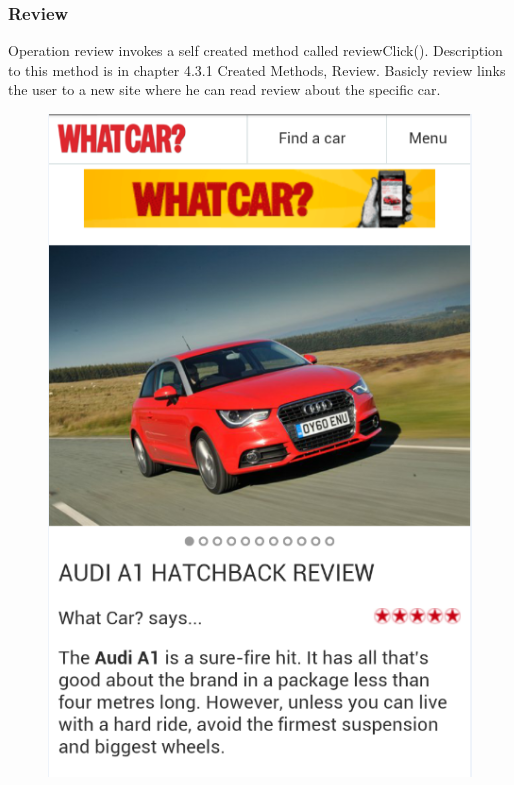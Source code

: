 \subsubsection{Review}
Operation review invokes a self created method called reviewClick(). Description to this method is in chapter 4.3.1 Created Methods, Review. Basicly review links the user to a new site where he can read review about the specific car.
\\
\begin{figure}[H]
\centering
\includegraphics[width=0.5\linewidth]{graphics/chapter4/9}
\caption{}
\label{fig:10}
\end{figure}
\newpage


